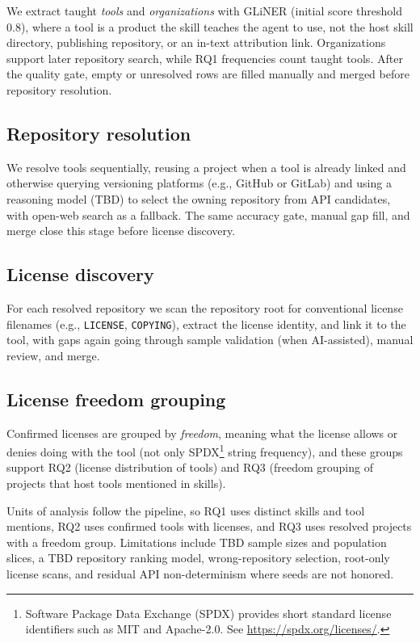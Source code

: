 We extract taught \emph{tools} and \emph{organizations} with GLiNER
(initial score threshold $0.8$), where a tool is a product the skill teaches
the agent to use, not the host skill directory, publishing repository, or an
in-text attribution link.
Organizations support later repository search, while RQ1 frequencies count
taught tools.
After the quality gate, empty or unresolved rows are filled manually and merged
before repository resolution.

\subsection{Repository resolution}

We resolve tools sequentially, reusing a project when a tool is already linked
and otherwise querying versioning platforms (e.g., GitHub or GitLab) and using
a reasoning model (TBD) to select the owning repository from API candidates,
with open-web search as a fallback.
The same accuracy gate, manual gap fill, and merge close this stage before
license discovery.

\subsection{License discovery}

For each resolved repository we scan the repository root for conventional
license filenames (e.g., \texttt{LICENSE}, \texttt{COPYING}), extract the
license identity, and link it to the tool, with gaps again going through sample
validation (when AI-assisted), manual review, and merge.

\subsection{License freedom grouping}

Confirmed licenses are grouped by \emph{freedom}, meaning what the license
allows or denies doing with the tool (not only SPDX\footnote{Software Package Data Exchange (SPDX) provides short standard license identifiers such as MIT and Apache-2.0. See \url{https://spdx.org/licenses/}.} string frequency), and these
groups support RQ2 (license distribution of tools) and RQ3 (freedom grouping of
projects that host tools mentioned in skills).

Units of analysis follow the pipeline, so RQ1 uses distinct skills and tool
mentions, RQ2 uses confirmed tools with licenses, and RQ3 uses resolved projects
with a freedom group.
Limitations include TBD sample sizes and population slices, a TBD repository
ranking model, wrong-repository selection, root-only license scans, and residual
API non-determinism where seeds are not honored.
